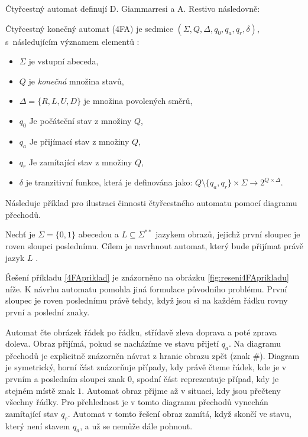Čtyřcestný automat definují D. Giammarresi a A. Restivo následovně:

\begin{definition}
Čtyřcestný konečný automat (4FA) je sedmice $(\Sigma, Q, \Delta, q_{0}, q_{a}, q_{r}, \delta)$, s~následujícím významem elementů \cite{RozenbergGrzegorz1997HoFL}:
\begin{itemize}
    \item $\Sigma$ je vstupní abeceda,
    \item $Q$ je \emph{konečná} množina stavů,
    \item $\Delta = \{R, L, U, D\}$ je množina povolených směrů,
    \item $q_{0}$ Je počáteční stav z množiny $Q$,
    \item $q_{a}$ Je přijímací stav z množiny $Q$,
    \item $q_{r}$ Je zamítající stav z množiny $Q$,
    \item $\delta$ je tranzitivní funkce, která je definována jako: $Q \setminus \{q_{a}, q_{r}\} \times \Sigma \longrightarrow 2^{Q \times \Delta}$.
\end{itemize}
\end{definition}

Následuje příklad pro ilustraci činnosti čtyřcestného automatu pomocí diagramu přechodů.

\begin{example}
Nechť je $\Sigma = \{0, 1\}$ abecedou a $L \subseteq \Sigma^{**}$ jazykem obrazů, jejichž první sloupec je roven sloupci poslednímu. Cílem je navrhnout automat, který bude přijímat právě jazyk $L$ \cite{RozenbergGrzegorz1997HoFL}.
\label{4FApriklad}
\end{example}

Řešení příkladu \ref{4FApriklad} je znázorněno na obrázku \ref{fig:reseni4FAprikladu} níže. K návrhu automatu pomohla jiná formulace původního problému. První sloupec je roven poslednímu právě tehdy, když jsou si na každém řádku rovny první a poslední znaky. 

Automat čte obrázek řádek po řádku, střídavě zleva doprava a poté zprava doleva. Obraz přijímá, pokud se nacházíme ve stavu přijetí $q_a$. Na diagramu přechodů je explicitně znázorněn návrat z hranic obrazu zpět (znak $\#$). Diagram je symetrický, horní část znázorňuje případy, kdy právě čteme řádek, kde je v prvním a posledním sloupci znak $0$, spodní část reprezentuje případ, kdy je stejném místě znak $1$. Automat obraz přijme až v situaci, kdy jsou přečteny všechny řádky. Pro přehlednost je v tomto diagramu přechodů vynechán zamítající stav $q_r$. Automat v tomto řešení obraz zamítá, když skončí ve stavu, který není stavem $q_a$, a už se nemůže dále pohnout. 

